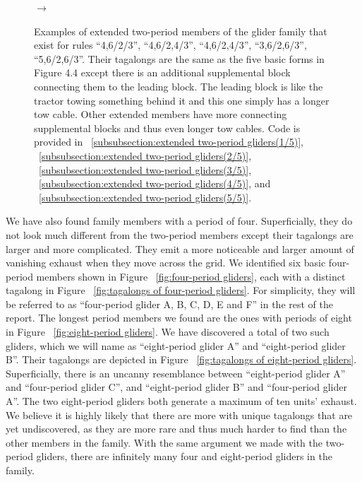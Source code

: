 \documentclass[12pt]{article}
\numberwithin{figure}{section} %
\begin{document}
\begin{figure}[H]
\begin{subfigure}{0.3\textwidth}
     		\subcaption{}
   	\end{subfigure}
      	{\LARGE$\xrightarrow{}$}
   	\setcounter{subfigure}{0}
   	\caption[Extended two-period gliders]{Examples of extended two-period members of the glider family that exist for rules “4,6/2/3”, “4,6/2,4/3”, “4,6/2,4/3”, “3,6/2,6/3”, “5,6/2,6/3”. Their tagalongs are the same as the five basic forms in Figure 4.4 except there is an additional supplemental block connecting them to the leading block. The leading block is like the tractor towing something behind it and this one simply has a longer tow cable. Other extended members have more connecting supplemental blocks and thus even longer tow cables. Code is provided in ~\ref{subsubsection:extended two-period gliders(1/5)}, ~\ref{subsubsection:extended two-period gliders(2/5)}, ~\ref{subsubsection:extended two-period gliders(3/5)}, ~\ref{subsubsection:extended two-period gliders(4/5)}, and ~\ref{subsubsection:extended two-period gliders(5/5)}. }
   	\label{fig:extended two-period gliders}
   	\vspace{-1.5em}
\end{figure}

We have also found family members with a period of four. Superficially, they do not look much different from the two-period members except their tagalongs are larger and more complicated. They emit a more noticeable and larger amount of vanishing exhaust when they move across the grid. We identified six basic four-period members shown in Figure ~\ref{fig:four-period gliders}, each with a distinct tagalong in Figure ~\ref{fig:tagalongs of four-period gliders}. For simplicity, they will be referred to as “four-period glider A, B, C, D, E and F” in the rest of the report. The longest period members we found are the ones with periods of eight in Figure ~\ref{fig:eight-period gliders}. We have discovered a total of two such gliders, which we will name as “eight-period glider A” and “eight-period glider B”. Their tagalongs are depicted in Figure ~\ref{fig:tagalongs of eight-period gliders}. Superficially, there is an uncanny resemblance between “eight-period glider A” and “four-period glider C”, and “eight-period glider B” and “four-period glider A”. The two eight-period gliders both generate a maximum of ten units’ exhaust. We believe it is highly likely that there are more with unique tagalongs that are yet undiscovered, as they are more rare and thus much harder to find than the other members in the family. With the same argument we made with the two-period gliders, there are infinitely many four and eight-period gliders in the family. 
\end{document}
